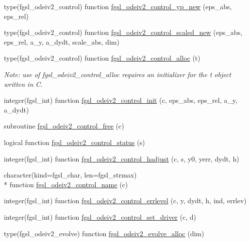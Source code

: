 \begin{DoxyCompactItemize}
\item 
type(fgsl\-\_\-odeiv2\-\_\-control) function \hyperlink{ode_8finc_afd262d0ea5bb3c0a5ed79264eaec7b52}{fgsl\-\_\-odeiv2\-\_\-control\-\_\-yp\-\_\-new} (eps\-\_\-abs, eps\-\_\-rel)
\item 
type(fgsl\-\_\-odeiv2\-\_\-control) function \hyperlink{ode_8finc_a326a95ff0c030fe8b25b50daf2b9e018}{fgsl\-\_\-odeiv2\-\_\-control\-\_\-scaled\-\_\-new} (eps\-\_\-abs, eps\-\_\-rel, a\-\_\-y, a\-\_\-dydt, scale\-\_\-abs, dim)
\item 
type(fgsl\-\_\-odeiv2\-\_\-control) function \hyperlink{ode_8finc_aa2838bdd478399790455f495923c2a2d}{fgsl\-\_\-odeiv2\-\_\-control\-\_\-alloc} (t)
\begin{DoxyCompactList}\small\item\em Note\-: use of fgsl\-\_\-odeiv2\-\_\-control\-\_\-alloc requires an initializer for the t object written in C. \end{DoxyCompactList}\item 
integer(fgsl\-\_\-int) function \hyperlink{ode_8finc_a4b0b791a775a86ef0f1f74cc68abcc68}{fgsl\-\_\-odeiv2\-\_\-control\-\_\-init} (c, eps\-\_\-abs, eps\-\_\-rel, a\-\_\-y, a\-\_\-dydt)
\item 
subroutine \hyperlink{ode_8finc_aadeb0256bb6a39f1d946c355ac6b2afa}{fgsl\-\_\-odeiv2\-\_\-control\-\_\-free} (c)
\item 
logical function \hyperlink{ode_8finc_af5fcca7af27c62493f685900fe29f999}{fgsl\-\_\-odeiv2\-\_\-control\-\_\-status} (s)
\item 
integer(fgsl\-\_\-int) function \hyperlink{ode_8finc_a4042d985c4d2cdc5f6c577bf86e72a5f}{fgsl\-\_\-odeiv2\-\_\-control\-\_\-hadjust} (c, s, y0, yerr, dydt, h)
\item 
character(kind=fgsl\-\_\-char, len=fgsl\-\_\-strmax) \\*
function \hyperlink{ode_8finc_ac9512303eeabe05335d9fbada1c5f841}{fgsl\-\_\-odeiv2\-\_\-control\-\_\-name} (c)
\item 
integer(fgsl\-\_\-int) function \hyperlink{ode_8finc_ad529291d0d2c826dec9976f5a24af8b1}{fgsl\-\_\-odeiv2\-\_\-control\-\_\-errlevel} (c, y, dydt, h, ind, errlev)
\item 
integer(fgsl\-\_\-int) function \hyperlink{ode_8finc_a53f1174dfc4a844b55c3654b4ac94c82}{fgsl\-\_\-odeiv2\-\_\-control\-\_\-set\-\_\-driver} (c, d)
\item 
type(fgsl\-\_\-odeiv2\-\_\-evolve) function \hyperlink{ode_8finc_a010ce00112539875b18c9741e3beaa6e}{fgsl\-\_\-odeiv2\-\_\-evolve\-\_\-alloc} (dim)
\item 

\end{DoxyCompactItemize}
